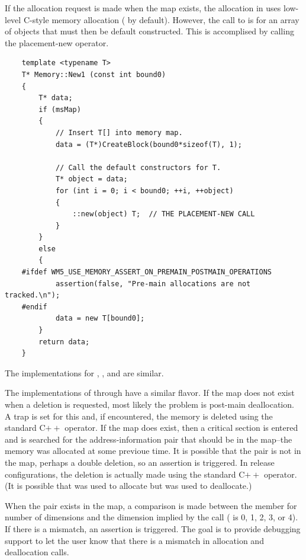 \documentclass{article}
\begin{document}
If the allocation request is made when the map exists, the allocation in
 uses low-level C-style memory allocation (
by default).  However, the call to  is for an array of objects that must
then be default constructed.  This is accomplised by calling the placement-new
operator.

\scriptsize
\begin{verbatim}
    template <typename T>
    T* Memory::New1 (const int bound0)
    {
        T* data;
        if (msMap)
        {
            // Insert T[] into memory map.
            data = (T*)CreateBlock(bound0*sizeof(T), 1);

            // Call the default constructors for T.
            T* object = data;
            for (int i = 0; i < bound0; ++i, ++object)
            {
                ::new(object) T;  // THE PLACEMENT-NEW CALL
            }
        }
        else
        {
    #ifdef WM5_USE_MEMORY_ASSERT_ON_PREMAIN_POSTMAIN_OPERATIONS
            assertion(false, "Pre-main allocations are not tracked.\n");
    #endif
            data = new T[bound0];
        }
        return data;
    }
\end{verbatim}
\normalsize

The implementations for , , and  are similar.

The implementations of  through  have a similar flavor.
If the map does not exist when a deletion is requested, most likely the problem
is post-main deallocation.  A trap is set for this and, if encountered, the memory
is deleted using the standard C$++$  operator.  If the map does exist,
then a critical section is entered and  is searched for the
address-information pair that should be in the map--the memory was allocated at some
previoue time.  It is possible that the pair is not in the map, perhaps a double
deletion, so an assertion is triggered.  In release configurations, the deletion is
actually made using the standard C$++$  operator.  (It is possible that
 was used to allocate but  was used to deallocate.)

When the pair exists in the map, a comparison is made between the 
member for number of dimensions and the dimension implied by the  call
( is 0, 1, 2, 3, or 4).  If there is a mismatch, an assertion is triggered.
The goal is to provide debugging support to let the user know that there is a mismatch
in allocation and deallocation calls.
\end{document}
